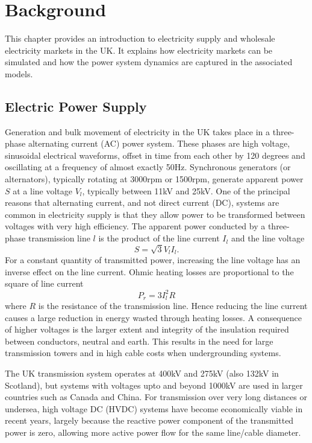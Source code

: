 \chapter{Background}
\label{ch:background}
This chapter provides an introduction to electricity supply and wholesale
electricity markets in the UK.  It explains how electricity markets can be
simulated and how the power system dynamics are captured in the associated
models.

\section{Electric Power Supply}

%

Generation and bulk movement of electricity in the UK takes place in a
three-phase alternating current (AC) power system.  These phases are
high voltage, sinusoidal electrical waveforms, offset in time from each
other by 120 degrees and oscillating at a frequency of almost exactly 50Hz.
Synchronous generators (or alternators), typically rotating at 3000rpm or
1500rpm, generate apparent power $S$ at a line voltage $V_l$, typically
between 11kV and 25kV.  One of the principal reasons that alternating current,
and not direct current (DC), systems are common in electricity supply is that
they allow power to be transformed between voltages with very high efficiency.
The apparent power conducted by a three-phase transmission line $l$ is the
product of the line current $I_l$ and the line voltage
\begin{equation}
S = \sqrt{3} V_l I_l .
\end{equation}
For a constant quantity of transmitted power, increasing the line voltage has
an inverse effect on the line current.  Ohmic heating losses are proportional to the
square of line current
\begin{equation}
P_{r} = 3 I_l^2 R
\end{equation}
where $R$ is the resistance of the transmission line.  Hence reducing the line
current causes a large reduction in energy wasted through heating losses.  A
consequence of higher voltages is the larger extent and integrity of the
insulation required between conductors, neutral and earth.  This results in
the need for large transmission towers and in high cable costs when
undergrounding systems.

The UK transmission system operates at 400kV and 275kV (also 132kV in
Scotland), but systems with voltages upto and beyond 1000kV are used in
larger countries such as Canada and China.  For transmission over very long
distances or undersea, high voltage DC (HVDC) systems have become economically
viable in recent years, largely because the reactive power component of the
transmitted power is zero, allowing more active power flow for the same
line/cable diameter.

